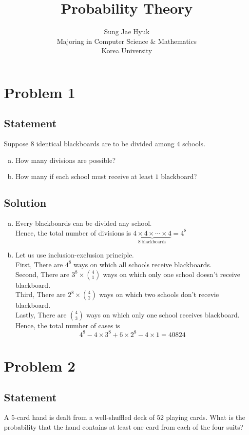 \documentclass[12pt]{article}
\title{Probability Theory}
\author{Sung Jae Hyuk\\Majoring in Computer Science $\&$ Mathematics\\Korea University}
\date{}
\theoremstyle{plain}
\begin{document}
	\maketitle
	\newpage
\section*{Problem 1}
	\subsection*{Statement}
	Suppose $8$ identical blackboards are to be divided among $4$ schools.
	\begin{enumerate}[(a)]
		\item How many divisions are possible?
		\item How many if each school must receive at least $1$ blackboard?
	\end{enumerate}
	\subsection*{Solution}
	\begin{enumerate}[(a)]
		\item  Every blackboards can be divided any school.
		\\Hence, the total number of divisions is $\underbrace{4\times4\times\cdots\times4}_{8\ \text{blackboards}}=4^8$
		\item  Let us use inclusion-exclusion principle.
		\\ First, There are $4^8$ ways on which all schools receive blackboards.
		\\ Second, There are $3^8\times\binom{4}{1}$ ways on which only one school doesn't receive blackboard.
		\\ Third, There are $2^8\times\binom{4}{2}$ ways on which two schools don't recevie blackboard.
		\\ Lastly, There are $\binom{4}{3}$ ways on which only one school receives blackboard.
		\\ Hence, the total number of cases is
		$$4^8-4\times3^8+6\times2^8-4\times1=40824$$
	\end{enumerate}
\newpage
\section*{Problem 2}
\subsection*{Statement}
A $5$-card hand is dealt from a well-shuffled deck of $52$ playing cards. What is the probability that the hand contains at least one card from each of the four suits?
\end{document}
